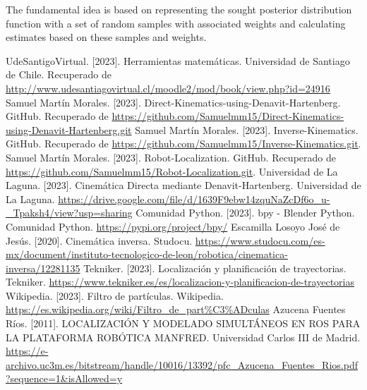 \documentclass[11pt]{report}
\begin{document}
The fundamental idea is based on representing the sought posterior distribution function with a set of random samples with associated weights and calculating estimates based on these samples and weights.

\begin{thebibliography}{99}
   UdeSantigoVirtual. [2023]. Herramientas matemáticas. Universidad de Santiago de Chile. Recuperado de \url{http://www.udesantiagovirtual.cl/moodle2/mod/book/view.php?id=24916}
   Samuel Martín Morales. [2023]. Direct-Kinematics-using-Denavit-Hartenberg. GitHub. Recuperado de \url{https://github.com/Samuelmm15/Direct-Kinematics-using-Denavit-Hartenberg.git}
   Samuel Martín Morales. [2023]. Inverse-Kinematics. GitHub. Recuperado de \url{https://github.com/Samuelmm15/Inverse-Kinematics.git}.
   Samuel Martín Morales. [2023]. Robot-Localization. GitHub. Recuperado de \url{https://github.com/Samuelmm15/Robot-Localization.git}.
   Universidad de La Laguna. [2023]. Cinemática Directa mediante Denavit-Hartenberg. Universidad de La Laguna. \url{https://drive.google.com/file/d/1639F9ebw14zquNaZcDf6o_u-_Tpaksh4/view?usp=sharing}
   Comunidad Python. [2023]. bpy - Blender Python. Comunidad Python. \url{https://pypi.org/project/bpy/}
   Escamilla Losoyo José de Jesús. [2020]. Cinemática inversa. Studocu. \url{https://www.studocu.com/es-mx/document/instituto-tecnologico-de-leon/robotica/cinematica-inversa/12281135}
   Tekniker. [2023]. Localización y planificación de trayectorias. Tekniker. \url{https://www.tekniker.es/es/localizacion-y-planificacion-de-trayectorias}
   Wikipedia. [2023]. Filtro de partículas. Wikipedia. \url{https://es.wikipedia.org/wiki/Filtro_de_part%C3%ADculas}
   Azucena Fuentes Ríos. [2011]. LOCALIZACIÓN Y MODELADO SIMULTÁNEOS
  EN ROS PARA LA PLATAFORMA ROBÓTICA
  MANFRED. Universidad Carlos III de Madrid. \url{https://e-archivo.uc3m.es/bitstream/handle/10016/13392/pfc_Azucena_Fuentes_Rios.pdf?sequence=1&isAllowed=y}
\end{thebibliography}
\end{document}
